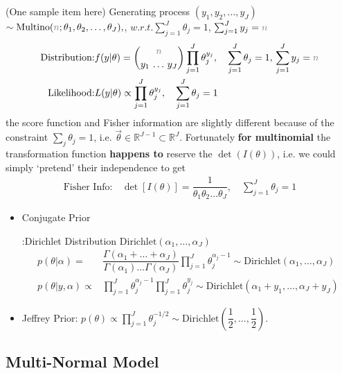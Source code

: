 (One sample item here) Generating process $ (y_1,y_2,\ldots,y_J) $ $ \sim \mathrm{Multino}(\fixed{n};\theta _1,\theta _2,\ldots,\theta _J)  ,$, $w.r.t. \sum_{j=1}^J \theta _j = 1$, $ \sum_{j=1}^Jy_j=\fixed{n} $ 
\begin{align*}
    \text{Distribution:}&f(y|\theta  )=\binom{\fixed{n}}{y _1\,\ldots\,y _J}\prod_{j=1}^J \theta _j^{y_j},\quad \sum_{j=1}^J\theta _j=1,\,\sum_{j=1}^Jy_j=\fixed{n}\\
    \text{Likelihood:}&L(y|\theta )\propto\prod_{j=1}^J \theta _j^{y_j},\quad \sum_{j=1}^J\theta _j=1
\end{align*}
    the score function and Fisher information are slightly different because of the constraint $ \sum_{j}\theta _j=1 $, i.e. $ \vec{\theta }\in \mathbb{R}^{J-1}\subset \mathbb{R}^J $. Fortunately \textbf{for multinomial} the transformation function \textbf{happens to} reserve the $\det(I(\theta ))$, i.e. we could simply `pretend' their independence to get 
    \begin{align*}
        \text{Fisher Info:}&\,\det\left[ I(\theta )\right]=\dfrac{1}{\theta _1\theta _2\ldots \theta _J},\quad \sum_{j=1}^J\theta _j=1
    \end{align*}
    
    
    
\begin{itemize}[topsep=2pt,itemsep=0pt]
    \item \hypertarget{MultinomConjugate}{Conjugate Prior}:Dirichlet Distribution $ \mathrm{ Dirichlet }(\alpha _1,\ldots,\alpha _J)  $
    \begin{align*}
        p(\theta |\alpha )=&\dfrac{ \Gamma (\alpha _1+\ldots+\alpha _J) }{ \Gamma (\alpha _1)\ldots\Gamma (\alpha _J) }\prod_{j=1}^J\theta _j^{\alpha _j-1}\sim \mathrm{ Dirichlet }(\alpha _1,\ldots,\alpha _J)    \\
        p(\theta |y,\alpha )\propto&\prod_{j=1}^J\theta _j^{\alpha _j-1}\prod_{j=1}^J\theta _j^{y_j}\sim \mathrm{Dirichlet }(\alpha _1+y_1,\ldots,\alpha _J+y_J)
    \end{align*}
    
    
    \item Jeffrey Prior: $ p(\theta  )\propto \prod_{j=1}^J\theta _j^{-1/2}\sim \mathrm{Dirichlet }(\dfrac{ 1 }{ 2 },\ldots,\dfrac{ 1 }{ 2 }  ) $.
\end{itemize}




\subsection{Multi-Normal Model}\label{SubSubSectionBayesianMultinormal}


